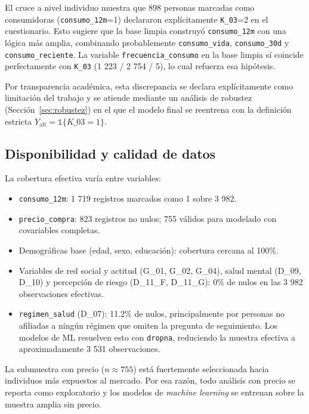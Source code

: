 \documentclass[12pt, a4paper]{article}
\begin{document}
El cruce a nivel individuo muestra que 898 personas marcadas como consumidoras (\texttt{consumo\_12m}=1) declararon explícitamente \texttt{K\_03}=2 en el cuestionario. Esto sugiere que la base limpia construyó \texttt{consumo\_12m} con una lógica más amplia, combinando probablemente \texttt{consumo\_vida}, \texttt{consumo\_30d} y \texttt{consumo\_reciente}. La variable \texttt{frecuencia\_consumo} en la base limpia sí coincide perfectamente con \texttt{K\_03} (1 223 / 2 754 / 5), lo cual refuerza esa hipótesis.

Por transparencia académica, esta discrepancia se declara explícitamente como limitación del trabajo y se atiende mediante un análisis de robustez (Sección~\ref{sec:robustez}) en el que el modelo final se reentrena con la definición estricta $Y_{\text{alt}}=\mathbb{1}\{K\_03=1\}$.

\subsection{Disponibilidad y calidad de datos}

La cobertura efectiva varía entre variables:

\begin{itemize}
    \item \texttt{consumo\_12m}: 1 719 registros marcados como 1 sobre 3 982.
    \item \texttt{precio\_compra}: 823 registros no nulos; 755 válidos para modelado con covariables completas.
    \item Demográficas base (edad, sexo, educación): cobertura cercana al 100\%.
    \item Variables de red social y actitud (G\_01, G\_02, G\_04), salud mental (D\_09, D\_10) y percepción de riesgo (D\_11\_F, D\_11\_G): 0\% de nulos en las 3 982 observaciones efectivas.
    \item \texttt{regimen\_salud} (D\_07): 11.2\% de nulos, principalmente por personas no afiliadas a ningún régimen que omiten la pregunta de seguimiento. Los modelos de ML resuelven esto con \texttt{dropna}, reduciendo la muestra efectiva a aproximadamente 3 531 observaciones.
\end{itemize}

La submuestra con precio (\(n\approx755\)) está fuertemente seleccionada hacia individuos más expuestos al mercado. Por esa razón, todo análisis con precio se reporta como exploratorio y los modelos de \textit{machine learning} se entrenan sobre la muestra amplia sin precio.
\end{document}
